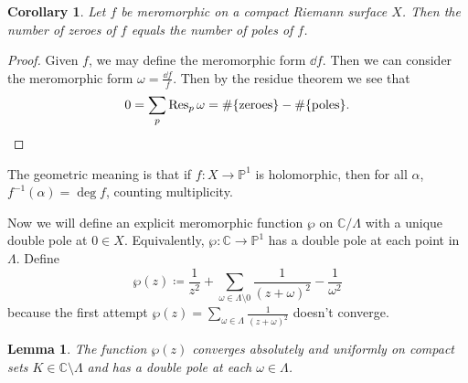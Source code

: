 \documentclass[leqno, openany]{memoir}
\newtheorem{cor}[thm]{Corollary}
\newtheorem{lem}[thm]{Lemma}
\theoremstyle{definition}
\theoremstyle{remark}
\theoremstyle{plain}
\theoremstyle{definition}
\theoremstyle{remark}
\newcommand{\C}{\mathbb{C}}
\renewcommand{\P}{\mathbb{P}}
\begin{document}
\begin{cor} Let $f$ be meromorphic on a compact Riemann surface $X$. Then the
number of zeroes of $f$ equals the number of poles of $f$.  \end{cor}

\begin{proof} Given $f$, we may define the meromorphic form $\dd{f}$. Then we
    can consider the meromorphic form $\omega = \frac{\dd{f}}{f}$. Then by the
    residue theorem we see that \[ 0 = \sum_p \Res_p \omega = \#
    \qty{\text{zeroes}} - \# \qty{\text{poles}}. \qedhere \] \end{proof}

The geometric meaning is that if $f \colon X \to \P^1$ is holomorphic, then for
all $\alpha$, $f^{-1}(\alpha) = \deg f$, counting multiplicity.

Now we will define an explicit meromorphic function $\wp$ on $\C/\Lambda$ with
a unique double pole at $0 \in X$. Equivalently, $\wp \colon \C \to \P^1$ has a
double pole at each point in $\Lambda$. Define \[ \wp(z) \coloneqq
\frac{1}{z^2} + \sum_{\omega \in \Lambda \setminus \qty{0}}
\frac{1}{{(z+\omega)}^2} - \frac{1}{\omega^2} \] because the first attempt
$\wp(z) = \sum_{\omega \in \Lambda} \frac{1}{{(z+\omega)}^2}$ doesn't converge.

\begin{lem} The function $\wp(z)$ converges absolutely and uniformly on compact
sets $K \in \C \setminus \Lambda$ and has a double pole at each $\omega \in
\Lambda$.  \end{lem}
\end{document}
